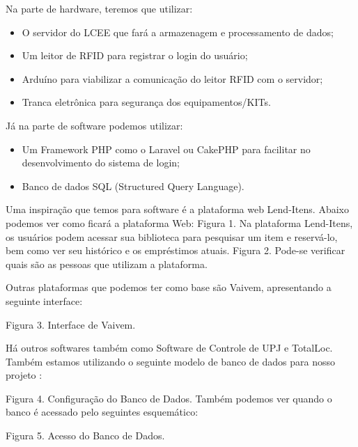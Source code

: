 \vspace{-42pt}
Na parte de hardware, teremos que utilizar:
\begin{itemize}
   \item O servidor do LCEE que fará a armazenagem e processamento de dados; 
   \item Um leitor de RFID para registrar o login do usuário;
   \item Arduíno para viabilizar a comunicação do leitor RFID com o servidor;
   \item Tranca eletrônica para segurança dos equipamentos/KITs.
\end{itemize}
Já na parte de software podemos utilizar:
\begin{itemize}
   \item Um Framework PHP como o Laravel ou CakePHP para facilitar no desenvolvimento do sistema de login; 
   \item Banco de dados SQL (Structured Query Language).
\end{itemize}

Uma inspiração que temos para software é a plataforma web Lend-Itens. Abaixo podemos ver como ficará a plataforma Web:
Figura 1. Na plataforma Lend-Itens, os usuários podem acessar sua biblioteca para pesquisar um item e reservá-lo, bem como ver seu histórico e os empréstimos atuais.
Figura 2. Pode-se verificar quais são as pessoas que utilizam a plataforma.

Outras plataformas que podemos ter como base são Vaivem, apresentando a seguinte interface:

Figura 3. Interface de Vaivem.

Há outros softwares também como Software de Controle de UPJ e TotalLoc.
Também estamos utilizando o seguinte modelo de banco de dados para nosso projeto :

Figura 4. Configuração do Banco de Dados.
Também podemos ver quando o banco é acessado pelo seguintes esquemático:

Figura 5. Acesso do Banco de Dados.